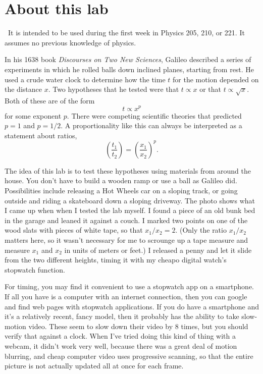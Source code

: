 \addtocounter{chapter}{-1}
\renewcommand\thechapter{c1.1}
\label{lab:covid-measurement}

\section*{About this lab}

\covid\ 
It is intended to be used during the first week in Physics 205, 210, or 221.
It assumes no previous knowledge of physics.

\introduction

In his 1638 book \emph{Discourses on Two New Sciences}, Galileo described a series
of experiments in which he rolled balls down inclined planes, starting from rest.
He used a crude water clock to determine how the time $t$ for the motion depended
on the distance $x$. Two hypotheses that he tested were that $t \propto x$ or
that $t \propto \sqrt{x}$. Both of these are of the form
\begin{equation*}
  t \propto x^p
\end{equation*}
for some exponent $p$. There were competing scientific theories that predicted
$p=1$ and $p=1/2$. A proportionality like this can always be interpreted as a statement
about ratios,
\begin{equation*}
  \left(\frac{t_1}{t_2}\right) = \left(\frac{x_1}{x_2}\right)^p.
\end{equation*}


\observations

The idea of this lab is to test these hypotheses using materials from
around the house. You don't have to build a wooden ramp or use a ball as Galileo did.
Possibilities include releasing a Hot Wheels car on a sloping track, or going outside
and riding a skateboard down a sloping driveway. The photo shows what I came up when
when I tested the lab myself. I found a piece of an old bunk bed in the garage and
leaned it against a couch. I marked two points on one of the wood slats with pieces
of white tape, so that $x_1/x_2=2$. (Only the ratio $x_1/x_2$ matters here, so it
wasn't necessary for me to scrounge up a tape measure and measure $x_1$ and $x_2$ in
units of meters or feet.) I released a penny and let it slide from the two different
heights, timing it with my cheapo digital watch's stopwatch function.


For timing, you may find it convenient to use a stopwatch app on a smartphone. If
all you have is a computer with an internet connection, then you can google and find web pages
with stopwatch applications. If you do have a smartphone and it's a relatively recent, fancy
model, then it probably has the ability to take slow-motion video. These seem to slow down
their video by 8 times, but you should verify that against a clock. When I've tried doing
this kind of thing with a webcam, it didn't work very well, because there was a great deal
of motion blurring, and cheap computer video uses progressive scanning, so that the entire
picture is not actually updated all at once for each frame.

